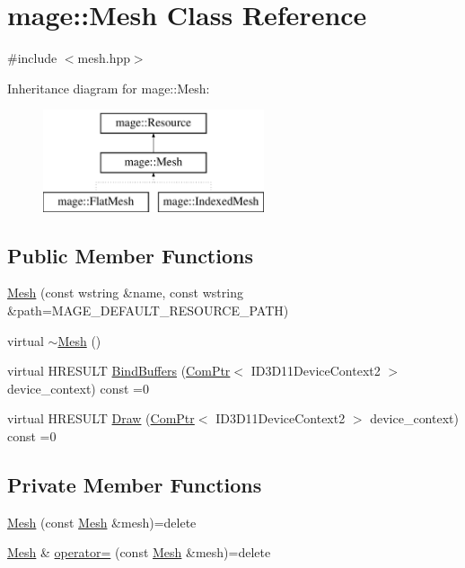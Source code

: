 \hypertarget{classmage_1_1_mesh}{}\section{mage\+:\+:Mesh Class Reference}
\label{classmage_1_1_mesh}


{\ttfamily \#include $<$mesh.\+hpp$>$}

Inheritance diagram for mage\+:\+:Mesh\+:\begin{figure}[H]
\begin{center}
\leavevmode
\includegraphics[height=3.000000cm]{classmage_1_1_mesh}
\end{center}
\end{figure}
\subsection*{Public Member Functions}
\begin{DoxyCompactItemize}
\item 
\hyperlink{classmage_1_1_mesh_a13a06eb10e3a4363bc16fc5f8d359264}{Mesh} (const wstring \&name, const wstring \&path=M\+A\+G\+E\+\_\+\+D\+E\+F\+A\+U\+L\+T\+\_\+\+R\+E\+S\+O\+U\+R\+C\+E\+\_\+\+P\+A\+TH)
\item 
virtual \hyperlink{classmage_1_1_mesh_ab7e701f7fcdc611479875a98c465da42}{$\sim$\+Mesh} ()
\item 
virtual H\+R\+E\+S\+U\+LT \hyperlink{classmage_1_1_mesh_a0e558e82b0db25b0bbb4abeba9f0fb0f}{Bind\+Buffers} (\hyperlink{namespacemage_ae74f374780900893caa5555d1031fd79}{Com\+Ptr}$<$ I\+D3\+D11\+Device\+Context2 $>$ device\+\_\+context) const =0
\item 
virtual H\+R\+E\+S\+U\+LT \hyperlink{classmage_1_1_mesh_a9dff8fa94d28e852fc1e72e6c0a85c6f}{Draw} (\hyperlink{namespacemage_ae74f374780900893caa5555d1031fd79}{Com\+Ptr}$<$ I\+D3\+D11\+Device\+Context2 $>$ device\+\_\+context) const =0
\end{DoxyCompactItemize}
\subsection*{Private Member Functions}
\begin{DoxyCompactItemize}
\item 
\hyperlink{classmage_1_1_mesh_a1627e85c72d10bdedbfbf746b108cc73}{Mesh} (const \hyperlink{classmage_1_1_mesh}{Mesh} \&mesh)=delete
\item 
\hyperlink{classmage_1_1_mesh}{Mesh} \& \hyperlink{classmage_1_1_mesh_a5baf961af32b379671a59a082492bc5e}{operator=} (const \hyperlink{classmage_1_1_mesh}{Mesh} \&mesh)=delete
\end{DoxyCompactItemize}


